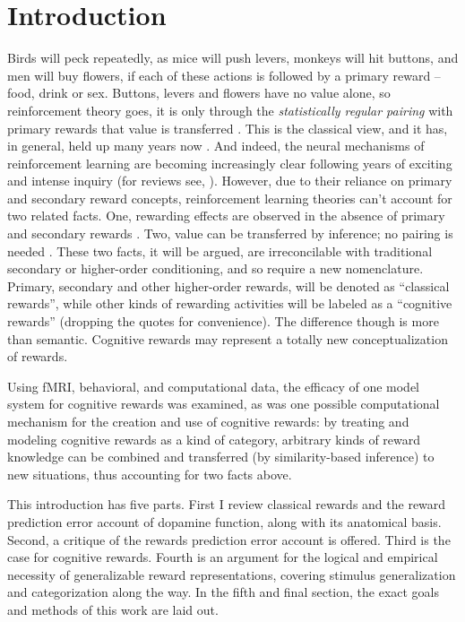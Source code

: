\documentclass[doc,12pt]{apa}        %
\begin{document}
\section{Introduction} %
\label{sec:introduction}
Birds will peck repeatedly, as mice will push levers, monkeys will hit buttons, and men will buy flowers, if each of these actions is followed by a primary reward -- food, drink or sex.  Buttons, levers and flowers have no value alone, so reinforcement theory goes, it is only through the \emph{statistically regular pairing} with primary rewards that value is transferred \cite{Rescorla:1988p8743}.  This is the classical view, and it has, in general, held up many years now \cite{iversen:2007aa}.  And indeed, the neural mechanisms of reinforcement learning are becoming increasingly clear following years of exciting and intense inquiry (for reviews see, ).  However, due to their reliance on primary and secondary reward concepts, reinforcement learning theories can't account for two related facts.  One, rewarding effects are observed in the absence of primary and secondary rewards \cite{Hayden:2009p6545, Lohrenz:2007p7240, Tricomi:2008p6663, Jimura:2010p8305}. Two, value can be transferred by inference; no pairing is needed \cite{BrombergMartin:2010p7223, Hampton:2006p2577}.  These two facts, it will be argued, are irreconcilable with traditional secondary or higher-order conditioning, and so require a new nomenclature.  Primary, secondary and other higher-order rewards, will be denoted as ``classical rewards'', while other kinds of rewarding activities will be labeled as a ``cognitive rewards'' (dropping the quotes for convenience).  The difference though is more than semantic.  Cognitive rewards may represent a totally new conceptualization of rewards.

Using fMRI, behavioral, and computational data, the efficacy of one model system for cognitive rewards was examined, as was one possible computational mechanism for the creation and use of cognitive rewards: by treating and modeling cognitive rewards as a kind of category, arbitrary kinds of reward knowledge can be combined and transferred (by similarity-based inference) to new situations, thus accounting for two facts above.

This introduction has five parts.  First I review classical rewards and the reward prediction error account of dopamine function, along with its anatomical basis.  Second, a critique of the rewards prediction error account is offered.  Third is the case for cognitive rewards.  Fourth is an argument for the logical and empirical necessity of generalizable reward representations, covering stimulus generalization and categorization along the way.  In the fifth and final section, the exact goals and methods of this work are laid out.  
\end{document}
